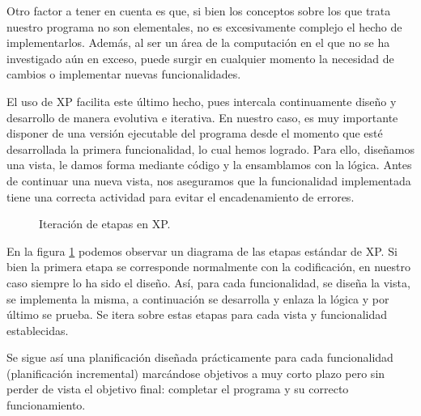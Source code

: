 Otro factor a tener en cuenta es que, si bien los conceptos sobre los que trata nuestro programa no son elementales, no es excesivamente complejo el hecho de implementarlos. Además, al ser un área de la computación en el que no se ha investigado aún en exceso, puede surgir en cualquier momento la necesidad de cambios o implementar nuevas funcionalidades.

El uso de XP facilita este último hecho, pues intercala continuamente diseño y desarrollo de manera evolutiva e iterativa. En nuestro caso, es muy importante disponer de una versión ejecutable del programa desde el momento que esté desarrollada la primera funcionalidad, lo cual hemos logrado. Para ello, diseñamos una vista, le damos forma mediante código y la ensamblamos con la lógica. Antes de continuar una nueva vista, nos aseguramos que la funcionalidad implementada tiene una correcta actividad para evitar el encadenamiento de errores.

\begin{figure}[!htb]
\begin{center}
\end{center}
\caption{Iteración de etapas en XP.}
\label{fig:fig1}
\end{figure}

En la figura \ref{fig:fig1} podemos observar un diagrama de las etapas estándar de XP. Si bien la primera etapa se corresponde normalmente con la codificación, en nuestro caso siempre lo ha sido el diseño. Así, para cada funcionalidad, se diseña la vista, se implementa la misma, a continuación se desarrolla y enlaza la lógica y por último se prueba. Se itera sobre estas etapas para cada vista y funcionalidad establecidas.

Se sigue así una planificación diseñada prácticamente para cada funcionalidad (planificación incremental) marcándose objetivos a muy corto plazo pero sin perder de vista el objetivo final: completar el programa y su correcto funcionamiento.

